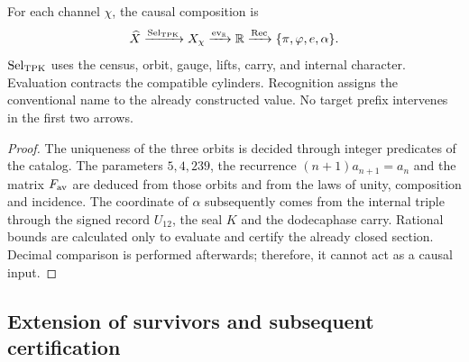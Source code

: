 \begin{proposition}
\label{prop:generacion-monodromica-separacion-causal-rev7}
For each channel \(\chi\), the causal composition is
\[
 \widehat X
 \xrightarrow{\operatorname{Sel}_{\rm TPK}}
 X_\chi
 \xrightarrow{\operatorname{ev}_{\mathbb R}}
 \mathbb R
 \xrightarrow{\operatorname{Rec}}
 \{\pi,\varphi,e,\alpha\}.
\]
\(\operatorname{Sel}_{\rm TPK}\) uses the census, orbit, gauge,
lifts, carry, and internal character. Evaluation contracts
the compatible cylinders. Recognition assigns the conventional name
to the already constructed value. No target prefix intervenes in the first two
arrows.
\end{proposition}

\begin{proof}
The uniqueness of the three orbits is decided through integer predicates of the
catalog. The parameters \(5,4,239\), the recurrence
\((n+1)a_{n+1}=a_n\) and the matrix \(F_{\rm av}\) are deduced from those orbits and
from the laws of unity, composition and incidence. The coordinate of
\(\alpha\) subsequently comes from the internal triple through the signed record
\(U_{12}\), the seal \(K\) and the dodecaphase carry. Rational bounds are
calculated only to evaluate and certify the already closed section. Decimal
comparison is performed afterwards; therefore, it cannot act as a
causal input.
\end{proof}

\subsection{Extension of survivors and subsequent certification}


